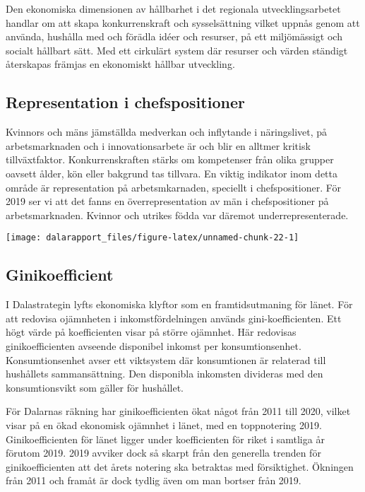 \documentclass[
]{article}
\begin{document}
Den ekonomiska dimensionen av hållbarhet i det regionala
utvecklingsarbetet handlar om att skapa konkurrenskraft och
sysselsättning vilket uppnås genom att använda, hushålla med och förädla
idéer och resurser, på ett miljömässigt och socialt hållbart sätt. Med
ett cirkulärt system där resurser och värden ständigt återskapas främjas
en ekonomiskt hållbar utveckling.

\hypertarget{representation-i-chefspositioner}{%
\subsection{Representation i
chefspositioner}\label{representation-i-chefspositioner}}

Kvinnors och mäns jämställda medverkan och inflytande i näringslivet, på
arbetsmarknaden och i innovationsarbete är och blir en alltmer kritisk
tillväxtfaktor. Konkurrenskraften stärks om kompetenser från olika
grupper oavsett ålder, kön eller bakgrund tas tillvara. En viktig
indikator inom detta område är representation på arbetsmkarnaden,
speciellt i chefspositioner. För 2019 ser vi att det fanns en
överrepresentation av män i chefspositioner på arbetsmarknaden. Kvinnor
och utrikes födda var däremot underrepresenterade.

\begin{center}\texttt{[image: dalarapport\_files/figure-latex/unnamed-chunk-22-1]} \end{center}

\hypertarget{ginikoefficient}{%
\subsection{Ginikoefficient}\label{ginikoefficient}}

I Dalastrategin lyfts ekonomiska klyftor som en framtidsutmaning för
länet. För att redovisa ojämnheten i inkomstfördelningen används
gini-koefficienten. Ett högt värde på koefficienten visar på större
ojämnhet. Här redovisas ginikoefficienten avseende disponibel inkomst
per konsumtionsenhet. Konsumtionsenhet avser ett viktsystem där
konsumtionen är relaterad till hushållets sammansättning. Den disponibla
inkomsten divideras med den konsumtionsvikt som gäller för hushållet.

För Dalarnas räkning har ginikoefficienten ökat något från 2011 till
2020, vilket visar på en ökad ekonomisk ojämnhet i länet, med en
toppnotering 2019. Ginikoefficienten för länet ligger under
koefficienten för riket i samtliga år förutom 2019. 2019 avviker dock så
skarpt från den generella trenden för ginikoefficienten att det årets
notering ska betraktas med försiktighet. Ökningen från 2011 och framåt
är dock tydlig även om man bortser från 2019.
\end{document}

